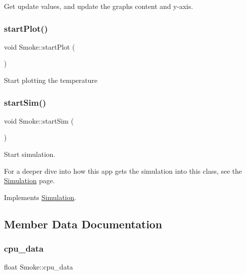 Get update values, and update the graph\textquotesingle{}s content and y-\/axis. \mbox{\label{classSmoke_a989e6653d16bee5d83dc53e766a1eae7}} 
\subsubsection{\texorpdfstring{startPlot()}{startPlot()}}
{\footnotesize\ttfamily void Smoke\+::start\+Plot (\begin{DoxyParamCaption}{ }\end{DoxyParamCaption})}

Start plotting the temperature \mbox{\label{classSmoke_aca6f4c3a6e62bf27920229c5b53ae561}} 
\subsubsection{\texorpdfstring{startSim()}{startSim()}}
{\footnotesize\ttfamily void Smoke\+::start\+Sim (\begin{DoxyParamCaption}{ }\end{DoxyParamCaption})\hspace{0.3cm}{\ttfamily [virtual]}}

Start simulation.

For a deeper dive into how this app gets the simulation into this class, see the \mbox{\hyperlink{classSimulation}{Simulation}} page. 

Implements \mbox{\hyperlink{classSimulation_ac523544ffc2b4cffed1d2a6ead5809b1}{Simulation}}.



\subsection{Member Data Documentation}
\mbox{\label{classSmoke_a27ecb4dc9f91a34bed0637c1743275cb}} 
\subsubsection{\texorpdfstring{cpu\_data}{cpu\_data}}
{\footnotesize\ttfamily float Smoke\+::cpu\+\_\+data\hspace{0.3cm}{\ttfamily [private]}}



